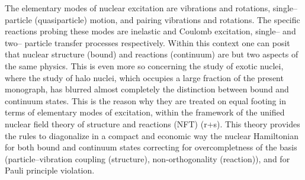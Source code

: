 The elementary modes of nuclear excitation are vibrations and rotations, single--particle (quasiparticle)  motion, and pairing vibrations and rotations. The specific reactions probing these modes are inelastic and Coulomb excitation,  single-- and two-- particle transfer processes respectively. Within this context one can posit that nuclear structure (bound) and reactions (continuum) are but two aspects of the same physics. This is even more so concerning the study of exotic nuclei, where the study of halo nuclei, which occupies a large fraction of the present monograph, has blurred almost completely the distinction between bound and continuum states. This is the reason why they are treated on equal footing in terms of elementary modes of excitation, within the framework of the unified nuclear field theory of structure and reactions (NFT) (r+s). This theory provides the rules to diagonalize in a compact and economic way the nuclear Hamiltonian for both bound and continuum states correcting for overcompletness of the basis (particle--vibration coupling (structure), non-orthogonality (reaction)), and for Pauli principle violation. 


